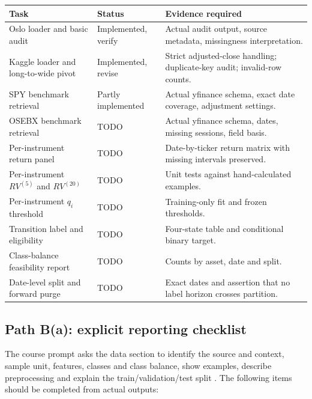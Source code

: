 \documentclass[11pt,a4paper]{article}
\begin{document}
\begin{longtable}{P{4.2cm}P{2.0cm}P{7.7cm}}
\toprule
\textbf{Task} & \textbf{Status} & \textbf{Evidence required}\\
\midrule
Oslo loader and basic audit & Implemented, verify & Actual audit output, source metadata, missingness interpretation.\\
Kaggle loader and long-to-wide pivot & Implemented, revise & Strict adjusted-close handling; duplicate-key audit; invalid-row counts.\\
SPY benchmark retrieval & Partly implemented & Actual yfinance schema, exact date coverage, adjustment settings.\\
OSEBX benchmark retrieval & TODO & Actual yfinance schema, dates, missing sessions, field basis.\\
Per-instrument return panel & TODO & Date-by-ticker return matrix with missing intervals preserved.\\
Per-instrument $RV^{(5)}$ and $RV^{(20)}$ & TODO & Unit tests against hand-calculated examples.\\
Per-instrument $q_i$ threshold & TODO & Training-only fit and frozen thresholds.\\
Transition label and eligibility & TODO & Four-state table and conditional binary target.\\
Class-balance feasibility report & TODO & Counts by asset, date and split.\\
Date-level split and forward purge & TODO & Exact dates and assertion that no label horizon crosses partition.\\
\bottomrule
\end{longtable}

\subsection{Path B(a): explicit reporting checklist}
\label{sec:pathba}

The course prompt asks the data section to identify the source and context, sample unit, features, classes and class balance, show examples, describe preprocessing and explain the train/validation/test split \cite{UiOProject3}. The following items should be completed from actual outputs:
\end{document}
